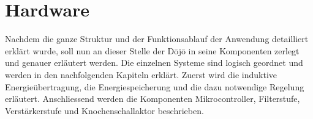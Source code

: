 \section{Hardware}\label{sec:hardware}
Nachdem die ganze Struktur und der Funktionsablauf der Anwendung detailliert erklärt wurde, soll nun an dieser Stelle der Dōjō in seine Komponenten zerlegt und genauer erläutert werden. Die einzelnen Systeme sind logisch geordnet und werden in den nachfolgenden Kapiteln erklärt. Zuerst wird die induktive Energieübertragung, die Energiespeicherung und die dazu notwendige Regelung erläutert. Anschliessend werden die Komponenten Mikrocontroller, Filterstufe, Verstärkerstufe und Knochenschallaktor beschrieben.